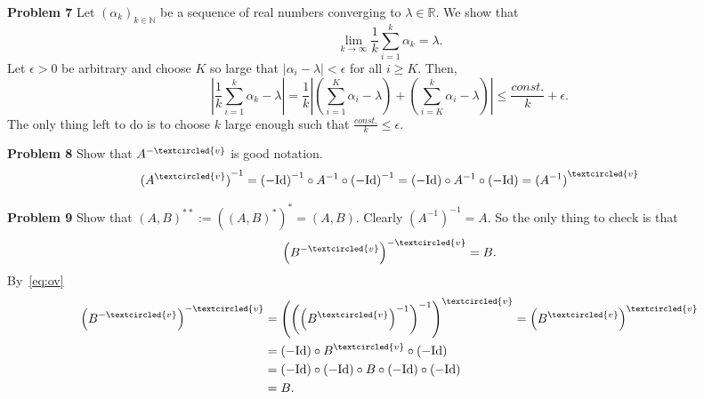 \documentclass{scrartcl}
\newcommand{\N}{\mathbb{N}}
\newcommand{\R}{\mathbb{R}}
\theoremstyle{plain}
\theoremstyle{remark}
\newcommand{\Id}{\textup{Id}}
\newcommand{\ov}{\textcircled{v}}
\begin{document}
\textbf{Problem 7} Let ${(\alpha_{k})}_{k \in \N}$ be a sequence of real numbers converging to $\lambda \in \R$. We show that
\begin{equation}
  \lim_{k \to \infty} \frac{1}{k} \sum_{i=1}^{k} \alpha_{k} = \lambda.
\end{equation}
Let $\epsilon>0$ be arbitrary and choose $K$ so large that $\lvert \alpha_{i} - \lambda \rvert < \epsilon$ for all $i\ge K$. Then,
\begin{equation}
  \left\lvert \frac{1}{k} \sum_{i=1}^{k} \alpha_{k} - \lambda \right\rvert = \frac{1}{k} \left\lvert \left(\sum_{i=1}^{K} \alpha_{i} - \lambda\right) + \left( \sum_{i=K}^{k} \alpha_{i} - \lambda \right) \right\rvert \le \frac{const.}{k} + \epsilon.
\end{equation}
The only thing left to do is to choose $k$ large enough such that $\frac{const.}{k} \le \epsilon$.

\textbf{Problem 8} Show that $A^{-\ov}$ is good notation.
\begin{equation}
  \label{eq:ov}
  {(A^{\ov})}^{-1} = {(-\Id)}^{-1} \circ A^{-1} \circ {(-\Id)}^{-1} = (-\Id) \circ A^{-1} \circ (-\Id) = {(A^{-1})}^{\ov}
\end{equation}

\textbf{Problem 9} Show that ${(A, B)}^{**} := {({(A, B)}^*)}^* = {(A, B)}$.
Clearly ${(A^{-1})}^{-1} = A$. So the only thing to check is that
\begin{equation}
  {\left(B^{-\ov}\right)}^{-\ov} = B.
\end{equation}
By~\eqref{eq:ov}
\begin{equation}
  \begin{aligned}
    {\left(B^{-\ov}\right)}^{-\ov} &= {\left({\left({\left(B^{\ov}\right)}^{-1}\right)}^{-1}\right)}^{\ov} = {\left(B^{\ov}\right)}^{\ov}\\
    &= {(-\Id)} \circ B^{\ov} \circ {(-\Id)} \\
    &= {(-\Id)} \circ {(-\Id)} \circ B \circ {(-\Id)} \circ {(-\Id)} \\
    &= B.
  \end{aligned}
\end{equation}
\end{document}
